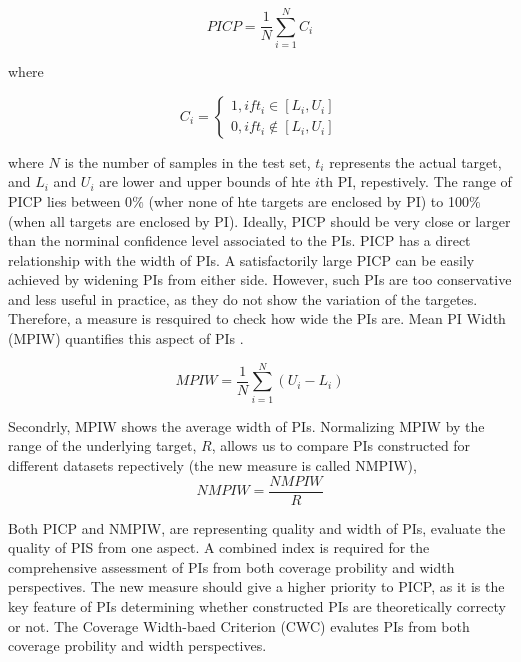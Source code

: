 \documentclass[review]{elsarticle}
\begin{document}
    \begin{equation}
      PICP = \frac{1}{N} \sum_{i=1}^{N} C_{i}
      \label{eq.PICP}
    \end{equation}

    where

    \begin{equation}
      C_{i} =
      \begin{cases}
        1, if t_{i} \in [L_{i},U_{i}] \\
        0, if t_{i} \not\in [L_{i},U_{i}]
      \end{cases}
      \label{eq.Ci}
    \end{equation}

    where $N$ is the number of samples in the test set, $t_{i}$ represents the actual target, and $L_{i}$ and $U_{i}$ are lower and upper bounds of hte $i$th PI, repestively. The range of PICP lies between 0$\%$ (wher none of hte targets are enclosed by PI) to 100$\%$ (when all targets are enclosed by PI). Ideally, PICP should be very close or larger than the norminal confidence level associated to the PIs.
    PICP has a direct relationship with the width of PIs. A satisfactorily large PICP can be easily achieved by widening PIs from either side. However, such PIs are too conservative and less useful in practice, as they do not show the variation of the targetes. Therefore, a measure is resquired to check how wide the PIs are. Mean PI Width (MPIW) quantifies this aspect of PIs \cite{Khosravi2010}.

    \begin{equation}
      MPIW = \frac{1}{N} \sum_{i=1}^{N} (U_{i}-L_{i})
      \label{eq.MPIW}
    \end{equation}

    Secondrly, MPIW shows the average width of PIs. Normalizing MPIW by the range of the underlying target, $R$, allows us to compare PIs constructed for different datasets repectively (the new measure is called NMPIW),
    \begin{equation}
      NMPIW = \frac{NMPIW}{R}
      \label{eq.NMPIW}
    \end{equation}

    Both PICP and NMPIW, are representing quality and width of PIs, evaluate the quality of PIS from one aspect. A combined index is required for the comprehensive assessment of PIs from both coverage probility and width perspectives. The new measure should give a higher priority to PICP, as it is the key feature of PIs determining whether constructed PIs are theoretically correcty or not. The Coverage Width-baed Criterion (CWC) evalutes PIs from both coverage probility and width perspectives.
\end{document}
